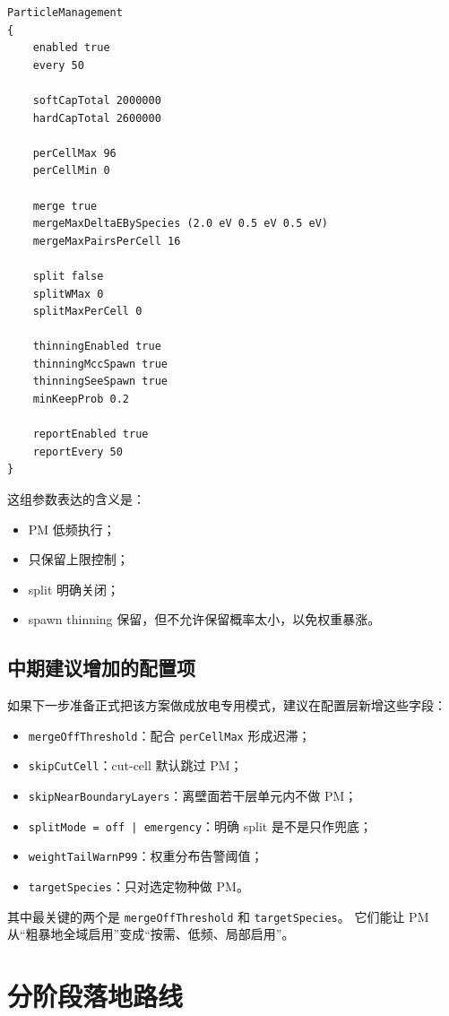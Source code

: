 \documentclass[UTF8,11pt,a4paper]{ctexart}
\begin{document}
\begin{lstlisting}
ParticleManagement
{
    enabled true
    every 50

    softCapTotal 2000000
    hardCapTotal 2600000

    perCellMax 96
    perCellMin 0

    merge true
    mergeMaxDeltaEBySpecies (2.0 eV 0.5 eV 0.5 eV)
    mergeMaxPairsPerCell 16

    split false
    splitWMax 0
    splitMaxPerCell 0

    thinningEnabled true
    thinningMccSpawn true
    thinningSeeSpawn true
    minKeepProb 0.2

    reportEnabled true
    reportEvery 50
}
\end{lstlisting}

这组参数表达的含义是：
\begin{itemize}[itemsep=3pt]
  \item PM 低频执行；
  \item 只保留上限控制；
  \item split 明确关闭；
  \item spawn thinning 保留，但不允许保留概率太小，以免权重暴涨。
\end{itemize}

\subsection{中期建议增加的配置项}
如果下一步准备正式把该方案做成放电专用模式，建议在配置层新增这些字段：
\begin{itemize}[itemsep=3pt]
  \item \texttt{mergeOffThreshold}：配合 \texttt{perCellMax} 形成迟滞；
  \item \texttt{skipCutCell}：cut-cell 默认跳过 PM；
  \item \texttt{skipNearBoundaryLayers}：离壁面若干层单元内不做 PM；
  \item \texttt{splitMode = off | emergency}：明确 split 是不是只作兜底；
  \item \texttt{weightTailWarnP99}：权重分布告警阈值；
  \item \texttt{targetSpecies}：只对选定物种做 PM。
\end{itemize}

其中最关键的两个是 \texttt{mergeOffThreshold} 和 \texttt{targetSpecies}。
它们能让 PM 从“粗暴地全域启用”变成“按需、低频、局部启用”。

\section{分阶段落地路线}
\end{document}
